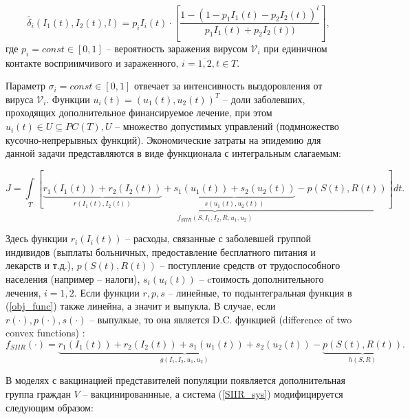 \begin{equation}\label{mod_delta}
    \widetilde{\delta_i}(I_1(t),I_2(t),l) = p_i I_i(t) \cdot \left[ \frac{1-(1 - p_1 I_1(t) - p_2 I_2(t))^l}{p_1 I_1(t) + p_2 I_2(t))} \right],
\end{equation}
где $p_i = const \in [0,1]$ -- вероятность заражения вирусом $\mathcal{V}_i$ при единичном контакте восприимчивого и зараженного, $i=\overline{1,2}, t \in T$.

Параметр $\sigma_i = const \in [0,1]$ отвечает за интенсивность выздоровления от вируса $\mathcal{V}_i$. Функции $u_i(t) = \left(  u_1(t), u_2(t) \right) ^ T$ -- доли заболевших, проходящих дополнительное финансируемое лечение, при этом $u_i(t) \in U \subseteq PC(T), U$ -- множество допустимых управлений (подмножество кусочно-непрерывных функций). Экономические затраты на эпидемию для данной задачи представляются в виде функционала с интегральным слагаемым:

\begin{equation}\label{obj_func}
    J = \int\limits_T \underbrace{\left[\underbrace{r_1(I_1(t)) + r_2(I_2(t))}_{r(I_1(t),I_2(t))} +\underbrace{s_1(u_1(t)) + s_2(u_2(t))}_{s(u_1(t),u_2(t))} - p(S(t),R(t)) \right]}_{f_{SIIR}(S,I_1,I_2,R,u_1,u_2)}dt.
\end{equation}

Здесь функции $r_i(I_i(t))$ -- расходы, связанные с заболевшей группой индивидов (выплаты больничных, предоставление бесплатного питания и лекарств и т.д.), $p(S(t),R(t))$ -- поступление средств от трудоспособного населения (например -- налоги), $s_i(u_i(t))$ -- cтоимость дополнительного лечения, $i=\overline{1,2}$. Если функции $r, p, s$ -- линейные, то подынтегральная функция в (\ref{obj_func}) также линейна, а значит и выпукла. В случае, если $r(\cdot), p(\cdot), s(\cdot)$ -- выпулкые, то она является D.C. функцией (difference of two convex functions) \cite{pshen,alexan}:
\begin{equation}\label{obj_func}
    f_{SIIR}(\cdot) = \underbrace{r_1(I_1(t)) + r_2(I_2(t)) + s_1(u_1(t)) + s_2(u_2(t))}_{g(I_1, I_2, u_1, u_2)} - \underbrace{p(S(t),R(t))}_{h(S,R)}.
\end{equation}

В моделях с вакцинацией представителей популяции появляется дополнительная группа граждан $V$ -- вакцинированнные, а система (\ref{SIIR_sys}) модифицируется следующим образом:

